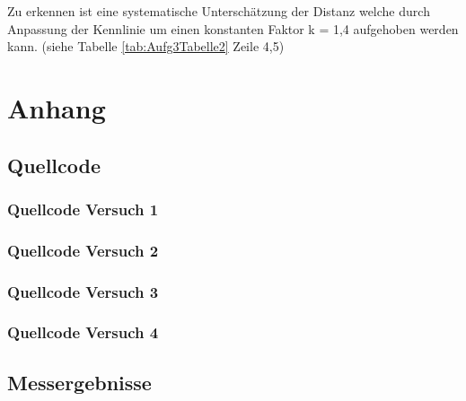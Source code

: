 \documentclass[12pt,oneside,a4paper]{report}
\begin{document}
Zu erkennen ist eine systematische Unterschätzung der Distanz welche durch Anpassung der Kennlinie um einen konstanten Faktor k = 1,4 aufgehoben werden kann. (siehe Tabelle \ref{tab:Aufg3Tabelle2} Zeile 4,5) 


%
%
\renewcommand\thesection{A.\arabic{section}}
\renewcommand\thesubsection{\thesection.\arabic{subsection}}

\chapter*{Anhang}
\label{chap:APPENDIX}
\addtocounter{chapter}{1}
\setcounter{section}{0}

\section{Quellcode}
\label{chap:APPENDIX_SOURCECODE}

\subsection{Quellcode Versuch 1}
\label{chap:APPENDIX_SOURCECODE_V1}

\subsection{Quellcode Versuch 2}
\label{chap:APPENDIX_SOURCECODE_V2}

\subsection{Quellcode Versuch 3}
\label{chap:APPENDIX_SOURCECODE_V3}

\subsection{Quellcode Versuch 4}
\label{chap:APPENDIX_SOURCECODE_V4}


\section{Messergebnisse}
\label{chap:APPENDIX_MEASUREMENT_SOURCE}

%
%

\end{document}
